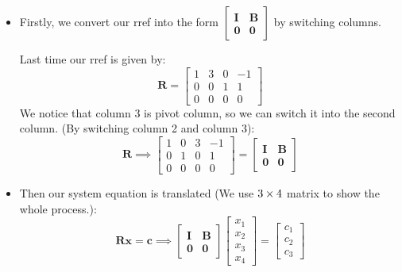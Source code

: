 \begin{itemize}
\item
Firstly, we convert our rref into the form $\begin{bmatrix}
\bm I&\bm B\\\bm 0&\bm 0
\end{bmatrix}$ by switching columns.
\begin{example}
Last time our rref is given by:
\[
\bm R = \begin{bmatrix}
1&3&0&-1\\0&0&1&1\\0&0&0&0
\end{bmatrix}
\]
We notice that column 3 is pivot column, so we can switch it into the second column. (By switching column 2 and column 3):
\[
\bm R\implies \begin{bmatrix}
1&0&3&-1\\0&1&0&1\\0&0&0&0
\end{bmatrix} = \begin{bmatrix}
\bm I&\bm B\\\bm 0&\bm 0
\end{bmatrix}
\]
\end{example}
\item
Then our system equation is translated (We use $3\times 4$ matrix to show the whole process.):
\[
\bm{Rx} = \bm c\implies \begin{bmatrix}
\bm I&\bm B\\\bm 0&\bm 0
\end{bmatrix}\begin{bmatrix}
x_1\\x_2\\x_3\\x_4
\end{bmatrix} = \begin{bmatrix}
c_1\\c_2\\c_3
\end{bmatrix}
\]
\newpage


\end{itemize}
